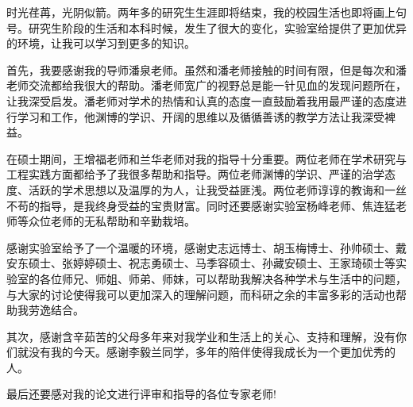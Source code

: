 ﻿时光荏苒，光阴似箭。两年多的研究生生涯即将结束，我的校园生活也即将画上句号。研究生阶段的生活和本科时候，发生了很大的变化，实验室给提供了更加优异的环境，让我可以学习到更多的知识。

首先，我要感谢我的导师潘泉老师。虽然和潘老师接触的时间有限，但是每次和潘老师交流都给我很大的帮助。潘老师宽广的视野总是能一针见血的发现问题所在，让我深受启发。潘老师对学术的热情和认真的态度一直鼓励着我用最严谨的态度进行学习和工作，他渊博的学识、开阔的思维以及循循善诱的教学方法让我深受裨益。

在硕士期间，王增福老师和兰华老师对我的指导十分重要。两位老师在学术研究与工程实践方面都给予了我很多帮助和指导。两位老师渊博的学识、严谨的治学态度、活跃的学术思想以及温厚的为人，让我受益匪浅。两位老师谆谆的教诲和一丝不苟的指导，是我终身受益的宝贵财富。同时还要感谢实验室杨峰老师、焦连猛老师等众位老师的无私帮助和辛勤栽培。

感谢实验室给予了一个温暖的环境，感谢史志远博士、胡玉梅博士、孙帅硕士、戴安东硕士、张婷婷硕士、祝志勇硕士、马季容硕士、孙藏安硕士、王家琦硕士等实验室的各位师兄、师姐、师弟、师妹，可以帮助我解决各种学术与生活中的问题，与大家的讨论使得我可以更加深入的理解问题，而科研之余的丰富多彩的活动也帮助我劳逸结合。

其次，感谢含辛茹苦的父母多年来对我学业和生活上的关心、支持和理解，没有你们就没有我的今天。感谢李毅兰同学，多年的陪伴使得我成长为一个更加优秀的人。

最后还要感对我的论文进行评审和指导的各位专家老师!